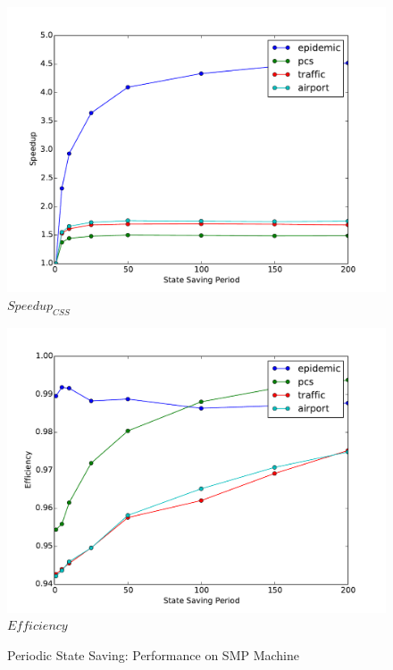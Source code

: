 \documentclass[11pt]{book}
\begin{document}
\begin{figure}
  \begin{minipage}{.5\textwidth}
    \begin{center}
      \includegraphics[width=\textwidth,keepaspectratio,quiet]{figs/state_saving/bc/speedup.pdf} \\
      $Speedup_{CSS}$ \\
    \end{center}
  \end{minipage}%
  \hfill
  \begin{minipage}{.5\textwidth}
    \begin{center}
      \includegraphics[width=\textwidth,keepaspectratio,quiet]{figs/state_saving/bc/efficiency.pdf} \\
      $Efficiency$ \\
    \end{center}
  \end{minipage}
  \caption{Periodic State Saving: Performance on SMP Machine}\label{ssp_analysis_smp_performance}
\end{figure}
\end{document}
